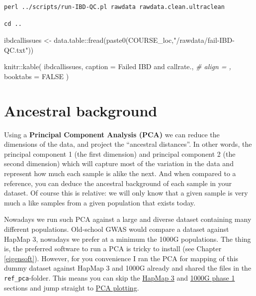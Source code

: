 \documentclass[
]{book}
\newenvironment{Shaded}{\begin{snugshade}}{\end{snugshade}}
\newcommand{\AttributeTok}[1]{\textcolor[rgb]{0.77,0.63,0.00}{#1}}
\newcommand{\CommentTok}[1]{\textcolor[rgb]{0.56,0.35,0.01}{\textit{#1}}}
\newcommand{\ConstantTok}[1]{\textcolor[rgb]{0.00,0.00,0.00}{#1}}
\newcommand{\FunctionTok}[1]{\textcolor[rgb]{0.00,0.00,0.00}{#1}}
\newcommand{\NormalTok}[1]{#1}
\newcommand{\OtherTok}[1]{\textcolor[rgb]{0.56,0.35,0.01}{#1}}
\newcommand{\SpecialCharTok}[1]{\textcolor[rgb]{0.00,0.00,0.00}{#1}}
\newcommand{\StringTok}[1]{\textcolor[rgb]{0.31,0.60,0.02}{#1}}
\begin{document}
\begin{verbatim}
perl ../scripts/run-IBD-QC.pl rawdata rawdata.clean.ultraclean
\end{verbatim}

\begin{verbatim}
cd ..
\end{verbatim}

\begin{Shaded}
\begin{Highlighting}[]
\NormalTok{ibdcallissues }\OtherTok{\textless{}{-}}\NormalTok{ data.table}\SpecialCharTok{::}\FunctionTok{fread}\NormalTok{(}\FunctionTok{paste0}\NormalTok{(COURSE\_loc,}\StringTok{"/rawdata/fail{-}IBD{-}QC.txt"}\NormalTok{))}
\end{Highlighting}
\end{Shaded}

\begin{Shaded}
\begin{Highlighting}[]
\NormalTok{knitr}\SpecialCharTok{::}\FunctionTok{kable}\NormalTok{(}
\NormalTok{  ibdcallissues, }
  \AttributeTok{caption =} \StringTok{\textquotesingle{}Failed IBD and callrate.\textquotesingle{}}\NormalTok{,}
  \CommentTok{\# align = ,}
  \AttributeTok{booktabs =} \ConstantTok{FALSE}
\NormalTok{)}
\end{Highlighting}
\end{Shaded}

\hypertarget{ancestral-background}{%
\section{Ancestral background}\label{ancestral-background}}

Using a \textbf{Principal Component Analysis (PCA)} we can reduce the dimensions of the data, and project the ``ancestral distances''. In other words, the principal component 1 (the first dimension) and principal component 2 (the second dimension) which will capture most of the variation in the data and represent how much each sample is alike the next. And when compared to a reference, you can deduce the ancestral background of each sample in your dataset. Of course this is relative: we will only know that a given sample is very much a like samples from a given population that exists today.

Nowadays we run such PCA against a large and diverse dataset containing many different populations. Old-school GWAS would compare a dataset against HapMap 3, nowadays we prefer at a minimum the 1000G populations. The thing is, the preferred software to run a PCA is tricky to install (see Chapter \ref{eigensoft}).
However, for you convenience I ran the PCA for mapping of this dummy dataset against HapMap 3 and 1000G already and shared the files in the \texttt{ref\_pca}-folder. This means you can skip the \protect\hyperlink{hapmap-3}{HapMap 3} and \protect\hyperlink{g-phase-1}{1000G phase 1} sections and jump straight to \protect\hyperlink{pca-plotting}{PCA plotting}.
\end{document}
